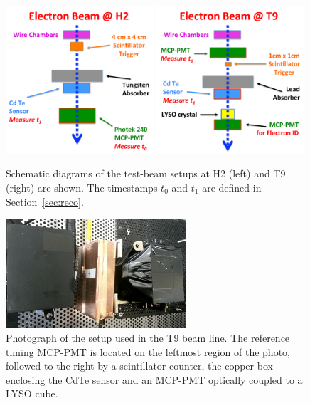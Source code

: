 \begin{figure}[htbp] 
\centering
\includegraphics[width=0.49\textwidth]{figures/H2_BeamSchematicDiagram.pdf} 
\includegraphics[width=0.49\textwidth]{figures/T9_BeamSchematicDiagram.pdf} 
\caption{Schematic diagrams of the test-beam setups at H2 (left) and T9 (right) are shown. 
The timestamps $t_0$ and $t_1$ are defined in Section~\ref{sec:reco}.} 
\label{fig:BeamSchematicDiagram} 
\end{figure} 

\begin{figure}[htbp] 
\centering
\includegraphics[width=0.60\textwidth]{figures/CdTeT9Setup.png} 
\caption{ Photograph of the setup used in the T9 beam line. The reference timing MCP-PMT 
is located on the leftmost region of the photo, followed to the right by a scintillator counter, 
the copper box enclosing the CdTe sensor and an MCP-PMT optically coupled to a LYSO cube. } 
\label{fig:SetupPhoto} 
\end{figure} 


